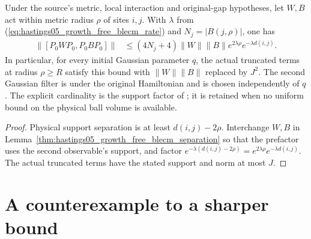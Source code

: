 \begin{lemma}
    \label{thm:hastings05_growth_free_metric_blecm}
    \leanok
    Under the source's metric, local interaction and original-gap
    hypotheses, let $W,B$ act within metric radius $\rho$ of sites $i,j$.
    With $\lambda$ from (\ref{eq:hastings05_growth_free_blecm_rate}) and
    $N_j=|B(j,\rho)|$, one has
    \begin{align}
        \|[P_0WP_0,P_0BP_0]\|
         & \le(4N_j+4)\|W\|\|B\|e^{2\lambda\rho}e^{-\lambda d(i,j)}.
        \label{eq:hastings05_growth_free_metric_blecm}
    \end{align}
    In particular, for every initial Gaussian parameter $q$, the actual
    truncated terms at radius $\rho\ge R$ satisfy this bound with
    $\|W\|\|B\|$ replaced by $J^2$. The second Gaussian filter is under
    the original Hamiltonian and is chosen independently of $q$.
    The explicit cardinality is the support factor of
    \cite[eqs.~(lc), (blecm), lines 1548--1601]{Hastings2006Solving}; it is
    retained when no uniform bound on the physical ball volume is available.
\end{lemma}
\begin{proof}\leanok
    Physical support separation is at least $d(i,j)-2\rho$.
    Interchange $W,B$ in
    Lemma~\ref{thm:hastings05_growth_free_blecm_separation} so that the
    prefactor uses the second observable's support, and factor
    $e^{-\lambda(d(i,j)-2\rho)}=e^{2\lambda\rho}e^{-\lambda d(i,j)}$.
    The actual truncated terms have the stated support and norm at most $J$.
\end{proof}

\section{A counterexample to a sharper bound}
\label{sec:low_energy_example}

